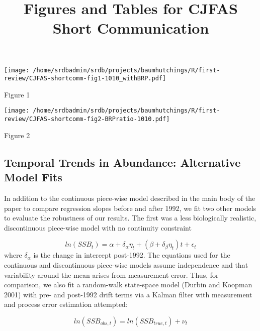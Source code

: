\documentclass[letterpaper,12pt]{article}
\title{Figures and Tables for CJFAS Short Communication}
\begin{document}
\maketitle{}



\begin{center}
\texttt{[image: /home/srdbadmin/srdb/projects/baumhutchings/R/first-review/CJFAS-shortcomm-fig1-1010\_withBRP.pdf]}
\end{center}
\noindent 
Figure 1

\begin{center}
\texttt{[image: /home/srdbadmin/srdb/projects/baumhutchings/R/first-review/CJFAS-shortcomm-fig2-BRPratio-1010.pdf]}
\end{center}
\noindent 
Figure 2


\clearpage

\subsection*{Temporal Trends in Abundance: Alternative Model Fits}
In addition to the continuous piece-wise model described in the main
body of the paper to compare regression slopes before and after 1992,
we fit two other models to evaluate the robustness of our results. The
first was a less biologically realistic, discontinuous piece-wise
model with no continuity constraint 

\begin{equation}
ln\left(SSB_{t}\right) = \alpha + \delta_{\alpha}\eta_{t} + \left(\beta + \delta_{\beta}\eta_{t}\right)t + \epsilon_{t}
\end{equation}
where $\delta_{\alpha}$ is the change in intercept post-1992. The equations
used for the continuous and discontinuous piece-wise models assume
independence and that variability around the mean arises from
measurement error. Thus, for comparison, we also fit a random-walk
state-space model (Durbin and Koopman 2001) with pre- and post-1992
drift terms via a Kalman filter with measurement and process error
estimation attempted: 

\begin{equation}
ln\left(SSB_{obs,t}\right) = ln\left(SSB_{true,t}\right) + \nu_{t}
\end{equation}
\end{document}
